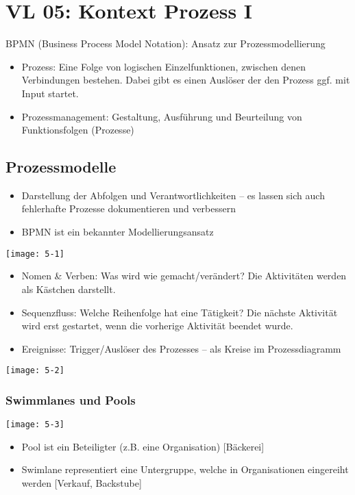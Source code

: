 \section{VL 05: Kontext Prozess I}

BPMN (Business Process Model Notation): Ansatz zur Prozessmodellierung

\begin{itemize}
  \item Prozess: Eine Folge von logischen Einzelfunktionen, zwischen denen Verbindungen bestehen. Dabei gibt es einen Auslöser der den Prozess ggf. mit Input startet.
  \item Prozessmanagement: Gestaltung, Ausführung und Beurteilung von Funktionsfolgen (Prozesse)
\end{itemize}


\subsection{Prozessmodelle}

\begin{itemize}
  \item Darstellung der Abfolgen und Verantwortlichkeiten – es lassen sich auch fehlerhafte Prozesse dokumentieren und verbessern
  \item BPMN ist ein bekannter Modellierungsansatz
\end{itemize}

\texttt{[image: 5-1]}

\begin{itemize}
  \item Nomen \& Verben: Was wird wie gemacht/verändert? Die Aktivitäten werden als Kästchen darstellt.
  \item Sequenzfluss: Welche Reihenfolge hat eine Tätigkeit? Die nächste Aktivität wird erst gestartet, wenn die vorherige Aktivität beendet wurde.
  \item Ereignisse: Trigger/Auslöser des Prozesses – als Kreise im Prozessdiagramm
\end{itemize}

\texttt{[image: 5-2]}


\subsubsection{Swimmlanes und Pools}

\texttt{[image: 5-3]}

\begin{itemize}
  \item Pool ist ein Beteiligter (z.B. eine Organisation) [Bäckerei]
  \item Swimlane representiert eine Untergruppe, welche in Organisationen eingereiht werden [Verkauf, Backstube]
\end{itemize}


